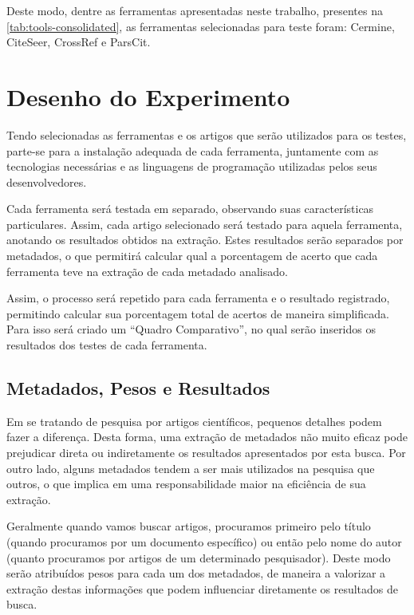 Deste modo, dentre as ferramentas apresentadas neste trabalho, presentes na \autoref{tab:tools-consolidated}, as ferramentas selecionadas para teste foram: Cermine, CiteSeer, CrossRef e ParsCit.
    

\section{Desenho do Experimento}
\label{sec:experiment-design}

Tendo selecionadas as ferramentas e os artigos que serão utilizados para os testes, parte-se para a instalação adequada de cada ferramenta, juntamente com as tecnologias necessárias e as linguagens de programação utilizadas pelos seus desenvolvedores. 

Cada ferramenta será testada em separado, observando suas características particulares. Assim, cada artigo selecionado será testado para aquela ferramenta, anotando os resultados obtidos na extração. Estes resultados serão separados por metadados, o que permitirá calcular qual a porcentagem de acerto que cada ferramenta teve na extração de cada metadado analisado.

Assim, o processo será repetido para cada ferramenta e o resultado registrado, permitindo calcular sua porcentagem total de acertos de maneira simplificada. Para isso será criado um ``Quadro Comparativo'', no qual serão inseridos os resultados dos testes de cada ferramenta. 

\subsection{Metadados, Pesos e Resultados}
\label{ssec:metadata-results}


Em se tratando de pesquisa por artigos científicos, pequenos detalhes podem fazer a diferença. Desta forma, uma extração de metadados não muito eficaz pode prejudicar direta ou indiretamente os resultados apresentados por esta busca. Por outro lado, alguns metadados tendem a ser mais utilizados na pesquisa que outros, o que implica em uma responsabilidade maior na eficiência de sua extração. 


Geralmente quando vamos buscar artigos, procuramos primeiro pelo título (quando procuramos por um documento específico) ou então pelo nome do autor (quanto procuramos por artigos de um determinado pesquisador). Deste modo serão atribuídos pesos para cada um dos metadados, de maneira a valorizar a extração destas informações que podem influenciar diretamente os resultados de busca.

